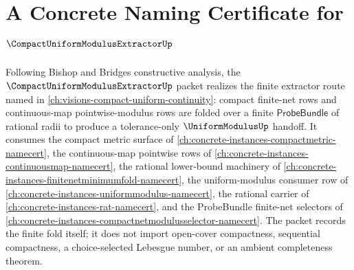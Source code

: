 \chapter{A Concrete Naming Certificate for $\CompactUniformModulusExtractorUp$}
\label{ch:concrete-instances-compact-uniform-modulus-extractor-namecert}

Following Bishop and Bridges constructive analysis, the $\CompactUniformModulusExtractorUp$ packet realizes the finite extractor route named in \autoref{ch:visions-compact-uniform-continuity}: compact finite-net rows and continuous-map pointwise-modulus rows are folded over a finite $\mathsf{ProbeBundle}$ of rational radii to produce a tolerance-only $\UniformModulusUp$ handoff. It consumes the compact metric surface of \autoref{ch:concrete-instances-compactmetric-namecert}, the continuous-map pointwise rows of \autoref{ch:concrete-instances-continuousmap-namecert}, the rational lower-bound machinery of \autoref{ch:concrete-instances-finitenetminimumfold-namecert}, the uniform-modulus consumer row of \autoref{ch:concrete-instances-uniformmodulus-namecert}, the rational carrier of \autoref{ch:concrete-instances-rat-namecert}, and the ProbeBundle finite-net selectors of \autoref{ch:concrete-instances-compactnetmodulusselector-namecert}. The packet records the finite fold itself; it does not import open-cover compactness, sequential compactness, a choice-selected Lebesgue number, or an ambient completeness theorem.


